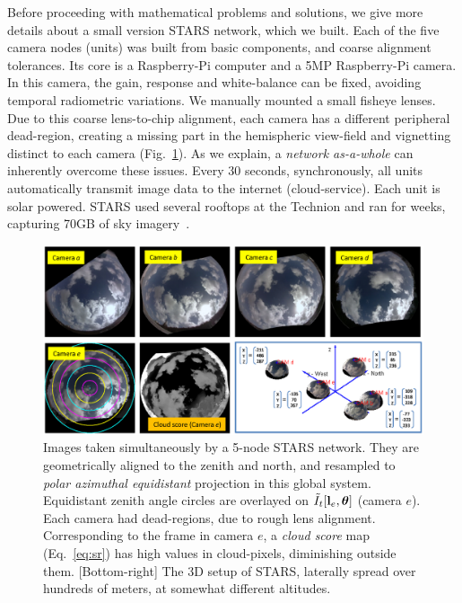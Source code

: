 \documentclass[runningheads]{llncs}
\begin{document}
Before proceeding with mathematical problems and solutions, we give more details about a small version STARS network, which we built. Each of the five camera nodes (units) was built from basic components, and coarse alignment tolerances. Its core is a Raspberry-Pi computer and a 5MP Raspberry-Pi camera. In this camera, the gain, response and white-balance can be fixed, avoiding temporal radiometric variations. We manually mounted a small fisheye lenses. Due to this coarse lens-to-chip alignment, each camera has a different peripheral dead-region, creating a missing part in the hemispheric view-field and vignetting distinct to each camera (Fig.~\ref{fig:photomotion}). As we explain, a {\em {\em network} as-a-whole} can inherently overcome these issues. Every 30 seconds, synchronously, all units automatically transmit image data to the internet (cloud-service). Each unit is solar powered.
STARS used several rooftops at the Technion and ran for weeks, capturing 70GB of sky imagery~\cite{download}.
\begin{figure}[t!]
\begin{center}
   \includegraphics[width=1\linewidth]{scene_d.eps}
\end{center}
   \vspace{-1.2cm}
   \caption{Images taken simultaneously by a 5-node STARS network. They are geometrically aligned to the zenith and north, and resampled to {\em polar azimuthal equidistant} projection in this global system. Equidistant zenith angle circles are overlayed on $\tilde I_t[{\bf l}_e,{\bm \theta}]$ (camera $e$). Each camera had dead-regions, due to rough lens alignment.
   Corresponding to the frame in camera $e$, a {\em cloud score} map (Eq.~\ref{eq:sr}) has high values in cloud-pixels, diminishing outside them. [Bottom-right] The 3D setup of STARS, laterally spread over hundreds of meters, at somewhat different altitudes.}
\label{fig:photomotion}
\end{figure}
\end{document}
